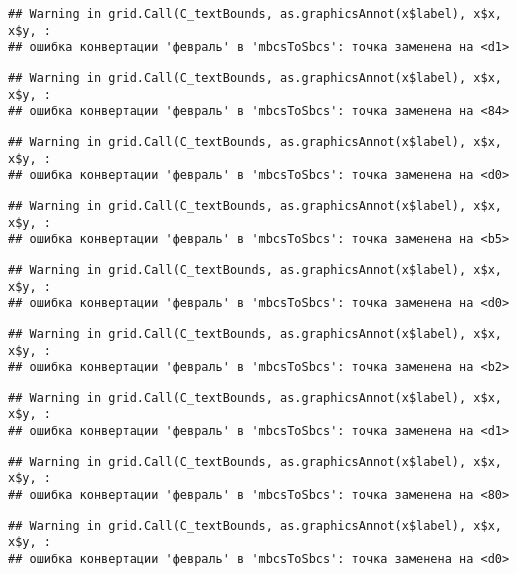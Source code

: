\documentclass[
]{article}
\begin{document}
\begin{verbatim}
## Warning in grid.Call(C_textBounds, as.graphicsAnnot(x$label), x$x, x$y, :
## ошибка конвертации 'февраль' в 'mbcsToSbcs': точка заменена на <d1>
\end{verbatim}

\begin{verbatim}
## Warning in grid.Call(C_textBounds, as.graphicsAnnot(x$label), x$x, x$y, :
## ошибка конвертации 'февраль' в 'mbcsToSbcs': точка заменена на <84>
\end{verbatim}

\begin{verbatim}
## Warning in grid.Call(C_textBounds, as.graphicsAnnot(x$label), x$x, x$y, :
## ошибка конвертации 'февраль' в 'mbcsToSbcs': точка заменена на <d0>
\end{verbatim}

\begin{verbatim}
## Warning in grid.Call(C_textBounds, as.graphicsAnnot(x$label), x$x, x$y, :
## ошибка конвертации 'февраль' в 'mbcsToSbcs': точка заменена на <b5>
\end{verbatim}

\begin{verbatim}
## Warning in grid.Call(C_textBounds, as.graphicsAnnot(x$label), x$x, x$y, :
## ошибка конвертации 'февраль' в 'mbcsToSbcs': точка заменена на <d0>
\end{verbatim}

\begin{verbatim}
## Warning in grid.Call(C_textBounds, as.graphicsAnnot(x$label), x$x, x$y, :
## ошибка конвертации 'февраль' в 'mbcsToSbcs': точка заменена на <b2>
\end{verbatim}

\begin{verbatim}
## Warning in grid.Call(C_textBounds, as.graphicsAnnot(x$label), x$x, x$y, :
## ошибка конвертации 'февраль' в 'mbcsToSbcs': точка заменена на <d1>
\end{verbatim}

\begin{verbatim}
## Warning in grid.Call(C_textBounds, as.graphicsAnnot(x$label), x$x, x$y, :
## ошибка конвертации 'февраль' в 'mbcsToSbcs': точка заменена на <80>
\end{verbatim}

\begin{verbatim}
## Warning in grid.Call(C_textBounds, as.graphicsAnnot(x$label), x$x, x$y, :
## ошибка конвертации 'февраль' в 'mbcsToSbcs': точка заменена на <d0>
\end{verbatim}
\end{document}
